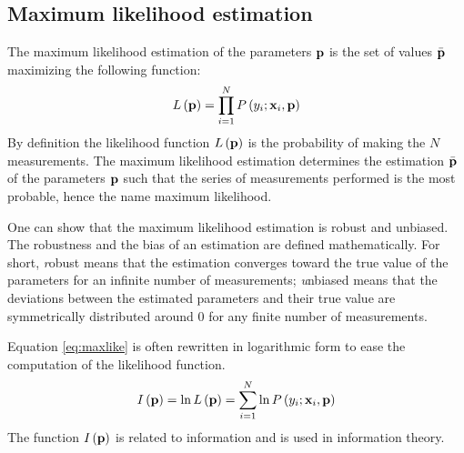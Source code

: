\subsection{Maximum likelihood estimation}
\label{sec:mlf} The maximum likelihood estimation of the
parameters ${\textbf p}$ is the set of values $\bar{\textbf p}$ maximizing
the following function:
\begin{equation}
\label{eq:maxlike}
  L\left({\textbf p}\right)=\prod_{i=1}^N P\left(y_i;{\textbf x}_i,{\textbf p}\right)
\end{equation}
By definition the likelihood function $L\left({\textbf p}\right)$ is
the probability of making the $N$ measurements. The maximum
likelihood estimation determines the estimation $\bar{\textbf p}$ of
the parameters ${\textbf p}$ such that the series of measurements
performed is the most probable, hence the name maximum likelihood.

One can show that the maximum likelihood estimation is robust and
unbiased. The robustness and the bias of an estimation are defined
mathematically. For short, {\textsl robust} means that the estimation
converges toward the true value of the parameters for an infinite
number of measurements; {\textsl unbiased} means that the deviations
between the estimated parameters and their true value are
symmetrically distributed around 0 for any finite number of
measurements.

Equation \ref{eq:maxlike} is often rewritten in logarithmic form
to ease the computation of the likelihood function.
\begin{equation}
\label{eq:logmaxlike}
  I\left({\textbf p}\right)=\ln L\left({\textbf p}\right)=\sum_{i=1}^N\ln P\left(y_i;{\textbf x}_i,{\textbf p}\right)
\end{equation}
The function $I\left({\textbf p}\right)$ is related to information and
is used in information theory.

